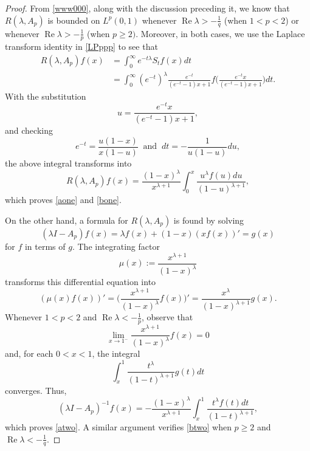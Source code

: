 \documentclass[10pt,a4paper]{amsart}
\renewcommand{\Re}[1]{\operatorname{Re} #1 }
\renewcommand{\geq}{\geqslant}
\begin{document}
\begin{proof}
From \eqref{www000}, along with the discussion preceding it, we know  that $R(\lambda, A_p)$ is bounded on $L^p(0, 1)$ whenever $\Re \lambda>-\frac{1}{q}$ (when $1 < p < 2$) or whenever $\Re \lambda > -\frac{1}{p}$ (when $p \geq 2)$.
Moreover, in both cases, we use the Laplace transform identity in  \eqref{LPppp} to see that 
\begin{align*}
R(\lambda,A_p)f(x) & =\int_{0}^{\infty}e^{-t\lambda}S_{t}f(x)dt\\
& =\int_{0}^{\infty}(e^{-t})^{\lambda}\frac{e^{-t}}{(e^{-t}-1)x+1}f\bigg(\frac{e^{-t}x}{(e^{-t}-1)x+1}\bigg)dt.
\end{align*}
With the substitution 
$$u=\frac{e^{-t}x}{(e^{-t}-1)x+1},$$ 
and checking
$$e^{-t} = \frac{u (1 - x)}{x (1 - u)} \;  \; \mbox{and} \; \; dt = - \frac{1}{u (1 - u)} du,$$
the above integral transforms into
$$
R(\lambda,A_p)f(x) = 
 \frac{(1-x)^{\lambda}}{x^{\lambda+1}}\int_{0}^{x}\frac{u^{\lambda}f(u)du}{(1-u)^{\lambda+1}},
$$
which proves \eqref{aone} and \eqref{bone}.



On the other hand, a formula for $R(\lambda,A_p)$ is found by solving
$$(\lambda I-A_p)f(x)=\lambda f(x)+(1-x)(xf(x))'=g(x)$$
for $f$ in terms of $g$. The integrating factor
$$\mu(x):=\frac{x^{\lambda +1}}{(1-x)^{\lambda}}$$
transforms this differential equation into 
$$(\mu(x)f(x))'=\Big(\frac{x^{\lambda +1}}{(1-x)^{\lambda}}f(x)\Big)'=\frac{x^{\lambda}}{(1-x)^{\lambda +1}}g(x).$$
Whenever $1 < p < 2$ and $\Re \lambda <-\frac{1}{p}$, observe that
$$\lim_{x \to 1^{-}} \frac{x^{\lambda +1}}{(1-x)^{\lambda}}f(x) = 0$$ and, for each $0 < x < 1$, the integral 
$$\int_{x}^{1}\frac{t^{\lambda}}{(1-t)^{\lambda +1}}g(t)dt$$
converges.
Thus,
$$(\lambda I-A_p)^{-1}f(x)=-\frac{(1-x)^{\lambda}}{x^{\lambda+1}}\int_{x}^{1}\frac{t^{\lambda}f(t)dt}{(1-t)^{\lambda+1}},
$$
which proves \eqref{atwo}. A similar argument verifies \eqref{btwo} when $p \geq 2$ and $\Re \lambda < -\frac{1}{q}$. 



\end{proof}
\end{document}
